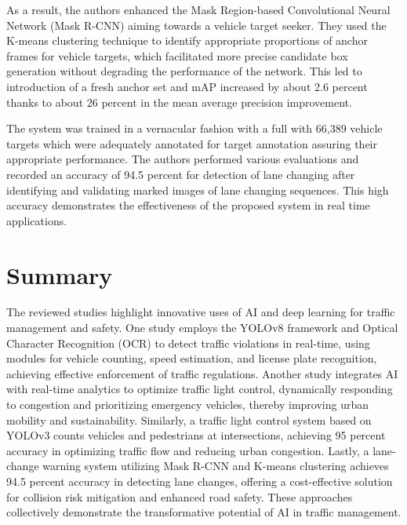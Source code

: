 As a result, the authors enhanced the Mask Region-based Convolutional Neural Network (Mask R-CNN) aiming towards a vehicle target seeker. They used the K-means clustering technique to identify appropriate proportions of anchor frames for vehicle targets, which facilitated more precise candidate box generation without degrading the performance of the network. This led to introduction of a fresh anchor set and mAP increased by about 2.6 percent thanks to about 26 percent in the mean average precision improvement.

The system was trained in a vernacular fashion with a full with 66,389 vehicle targets which were adequately annotated for target annotation assuring their appropriate performance. The authors performed various evaluations and recorded an accuracy of 94.5 percent for detection of lane changing after identifying and validating marked images of lane changing sequences. This high accuracy demonstrates the effectiveness of the proposed system in real time applications.


\newpage
\section{Summary}
The reviewed studies highlight innovative uses of AI and deep learning for traffic management and safety. One study employs the YOLOv8 framework and Optical Character Recognition (OCR) to detect traffic violations in real-time, using modules for vehicle counting, speed estimation, and license plate recognition, achieving effective enforcement of traffic regulations. Another study integrates AI with real-time analytics to optimize traffic light control, dynamically responding to congestion and prioritizing emergency vehicles, thereby improving urban mobility and sustainability. Similarly, a traffic light control system based on YOLOv3 counts vehicles and pedestrians at intersections, achieving 95 percent accuracy in optimizing traffic flow and reducing urban congestion. Lastly, a lane-change warning system utilizing Mask R-CNN and K-means clustering achieves 94.5 percent accuracy in detecting lane changes, offering a cost-effective solution for collision risk mitigation and enhanced road safety. These approaches collectively demonstrate the transformative potential of AI in traffic management.







